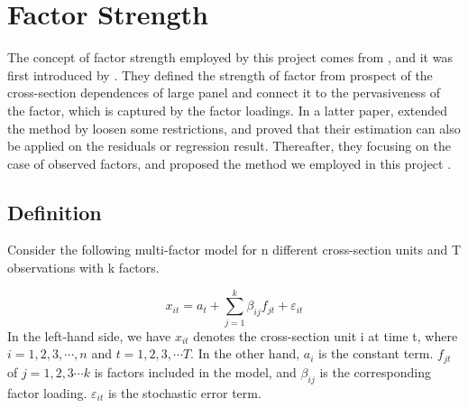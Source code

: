 








		
%		
\section{Factor Strength}\label{strength}
The concept of factor strength employed by this project comes from , and it was first introduced by .
They defined the strength of factor from prospect of the cross-section dependences of large panel and connect it to the pervasiveness of the factor, which is captured by the factor loadings.
In a latter paper,  extended the method by loosen some restrictions, and proved that their estimation can also be applied on the residuals or regression result.
Thereafter, they focusing on the case of observed factors, and proposed the method we employed in this project \cite{Bailey2020}.

		\subsection{Definition}\label{strength_definiton}

Consider the following multi-factor model for n different cross-section units and T observations with k  factors.

\[  x_{it} = a_{t}+  \sum_{j=1}^{k}\beta_{ij}f_{jt} + \varepsilon_{it} \tag{1}\label{definition_model} \]
In the left-hand side, we have $x_{it}$ denotes the cross-section unit i at time t, where $i = 1, 2,3, \cdots, n$ and $t = 1,2,3, \cdots T$.  
In the other hand, $a_{i}$ is the constant term.
$f_{jt}$ of $j = 1, 2, 3\cdots k$ is factors included in the model, and $\beta_{ij}$ is the corresponding factor loading.
$\varepsilon_{it}$ is the stochastic error term.

